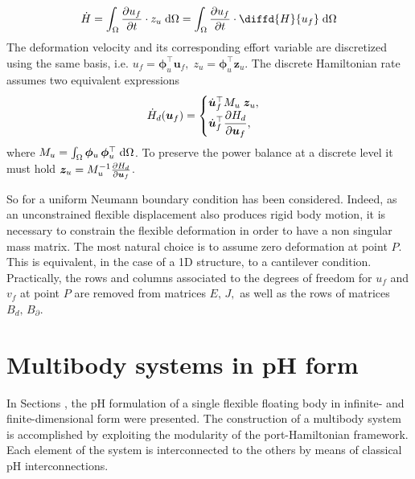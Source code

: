 \[
\dot{H} = \int_{\Omega} \diffp{u_f}{t} \cdot z_{u} \d{\Omega} = \int_{\Omega} \diffp{u_f}{t} \cdot \diffd{H}{u_f} \d{\Omega}
\]
The deformation velocity and its corresponding effort variable are discretized using the same basis, i.e. $u_f = \bm{\phi}_u^\top \bm{u}_f, \; z_u = \bm{\phi}_u^\top \bm{z}_u$. The discrete Hamiltonian rate assumes two equivalent expressions
\begin{equation*}
\dot{H}_d(\bm{u}_f) = 
\begin{cases}
\dot{\bm{u}}_f^\top {M}_u \; \bm{z}_u, \\
\displaystyle \dot{\bm{u}}_f^\top \diffp{H_d}{\bm{u}_f},
\end{cases}
\end{equation*}
where ${M}_u=\int_{\Omega} \bm{\phi}_u \, \bm{\phi}_u^\top \d{\Omega}$. To preserve the power balance at a discrete level it must hold $ \bm{z}_u = {M}_u^{-1} \diffp{H_d}{\bm{u}_f}$. \\

\begin{remark}\label{rmk:def_P}
So for a uniform Neumann boundary condition has been considered. Indeed, as an unconstrained flexible displacement also produces rigid body motion, it is necessary to constrain the flexible deformation in order to have a non singular mass matrix. The most natural choice is to assume zero deformation at point $P$. This is equivalent, in the case of a 1D structure, to a cantilever condition. Practically, the rows and columns associated to the degrees of freedom for $u_f$ and $v_f$ at point $P$ are removed from matrices ${E}, \, {J},$ as well as the rows of matrices ${B}_d, \, {B}_\partial$.
\end{remark}


\section{Multibody systems in pH form}
In Sections ,  the pH formulation of a single flexible floating body in infinite- and finite-dimensional form were presented. The construction of a multibody system is accomplished by exploiting the modularity of the port-Hamiltonian framework. Each element of the system is interconnected to the others by means of classical pH interconnections.

